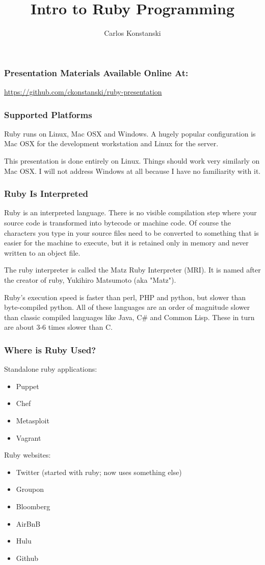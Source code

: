 \documentclass[helvetica,english,utf8,notitle,nologo]{beamer}
\begin{document}
\title{Intro to Ruby Programming}
\author{Carlos Konstanski}

\frame{\titlepage}

\begin{frame}
  \frametitle{Presentation Materials Available Online At:}
  \href{url}{https://github.com/ckonstanski/ruby-presentation}
\end{frame}

\begin{frame}
  \frametitle{Supported Platforms}
  
  Ruby runs on Linux, Mac OSX and Windows. A hugely popular
  configuration is Mac OSX for the development workstation and Linux
  for the server.

  This presentation is done entirely on Linux. Things should work very
  similarly on Mac OSX. I will not address Windows at all because I
  have no familiarity with it.
  
\end{frame}

\begin{frame}
  \frametitle{Ruby Is Interpreted}

  Ruby is an interpreted language. There is no visible compilation
  step where your source code is transformed into bytecode or machine
  code. Of course the characters you type in your source files need to
  be converted to something that is easier for the machine to execute,
  but it is retained only in memory and never written to an object
  file.

  The ruby interpreter is called the Matz Ruby Interpreter (MRI). It
  is named after the creator of ruby, Yukihiro Matsumoto (aka "Matz").

  Ruby's execution speed is faster than perl, PHP and python, but
  slower than byte-compiled python. All of these languages are an
  order of magnitude slower than classic compiled languages like Java,
  C\# and Common Lisp. These in turn are about 3-6 times slower than
  C.

\end{frame}

\begin{frame}
  \frametitle{Where is Ruby Used?}

  Standalone ruby applications:
  
  \begin{itemize}
  \item Puppet
  \item Chef
  \item Metasploit
  \item Vagrant
  \end{itemize}

  Ruby websites:

  \begin{itemize}
  \item Twitter (started with ruby; now uses something else)
  \item Groupon
  \item Bloomberg
  \item AirBnB
  \item Hulu
  \item Github
  \end{itemize}
\end{frame}
\end{document}
